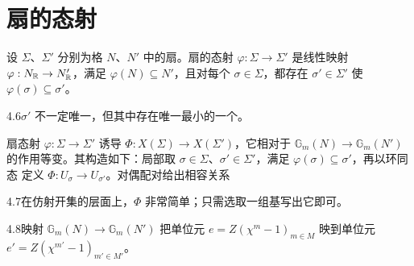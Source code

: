 \section{扇的态射}
\begin{definition}\label{def:4.8}
设 $\Sigma$、$\Sigma'$ 分别为格 $N$、$N'$ 中的扇。扇的态射 $\varphi:\Sigma\to\Sigma'$ 是线性映射 $\varphi:N_{\mathbb R}\to N'_{\mathbb R}$，满足 $\varphi(N)\subseteq N'$，且对每个 $\sigma\in\Sigma$，都存在 $\sigma'\in\Sigma'$ 使 $\varphi(\sigma)\subseteq\sigma'$。
\end{definition}
\begin{Note}{4.6}$\sigma'$ 不一定唯一，但其中存在唯一最小的一个。\end{Note}
\begin{definition}[环面态射的构造]\label{def:4.9}
扇态射 $\varphi:\Sigma\to\Sigma'$ 诱导 $\Phi:X(\Sigma)\to X(\Sigma')$，它相对于 $\mathbb G_m(N)\to\mathbb G_m(N')$ 的作用等变。其构造如下：局部取 $\sigma\in\Sigma$、$\sigma'\in\Sigma'$，满足 $\varphi(\sigma)\subseteq\sigma'$，再以环同态
定义 $\Phi:U_\sigma\to U_{\sigma'}$。对偶配对给出相容关系
\end{definition}
\begin{Note}{4.7}在仿射开集的层面上，$\Phi$ 非常简单；只需选取一组基写出它即可。\end{Note}
\begin{Note}{4.8}映射 $\mathbb G_m(N)\to\mathbb G_m(N')$ 把单位元 $e=Z(\chi^m-1)_{m\in M}$ 映到单位元 $e'=Z(\chi^{m'}-1)_{m'\in M'}$。\end{Note}
